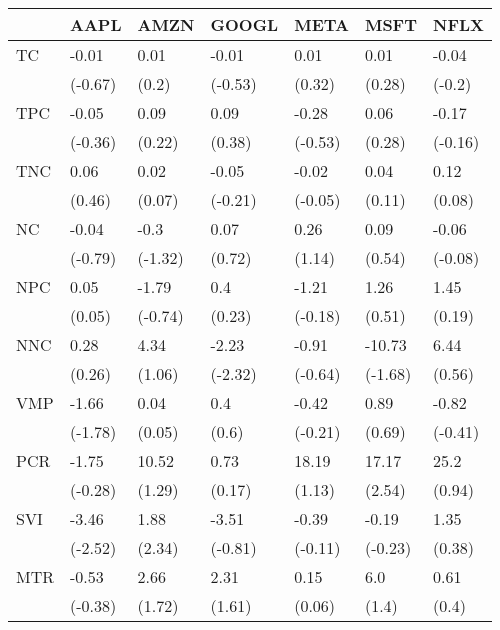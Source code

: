 \begin{tabular}{lllllll}
\toprule
{} &     AAPL &     AMZN &    GOOGL &     META &     MSFT &     NFLX \\
\midrule
TC  &    -0.01 &     0.01 &    -0.01 &     0.01 &     0.01 &    -0.04 \\
    &  (-0.67) &    (0.2) &  (-0.53) &   (0.32) &   (0.28) &   (-0.2) \\
TPC &    -0.05 &     0.09 &     0.09 &    -0.28 &     0.06 &    -0.17 \\
    &  (-0.36) &   (0.22) &   (0.38) &  (-0.53) &   (0.28) &  (-0.16) \\
TNC &     0.06 &     0.02 &    -0.05 &    -0.02 &     0.04 &     0.12 \\
    &   (0.46) &   (0.07) &  (-0.21) &  (-0.05) &   (0.11) &   (0.08) \\
NC  &    -0.04 &     -0.3 &     0.07 &     0.26 &     0.09 &    -0.06 \\
    &  (-0.79) &  (-1.32) &   (0.72) &   (1.14) &   (0.54) &  (-0.08) \\
NPC &     0.05 &    -1.79 &      0.4 &    -1.21 &     1.26 &     1.45 \\
    &   (0.05) &  (-0.74) &   (0.23) &  (-0.18) &   (0.51) &   (0.19) \\
NNC &     0.28 &     4.34 &    -2.23 &    -0.91 &   -10.73 &     6.44 \\
    &   (0.26) &   (1.06) &  (-2.32) &  (-0.64) &  (-1.68) &   (0.56) \\
VMP &    -1.66 &     0.04 &      0.4 &    -0.42 &     0.89 &    -0.82 \\
    &  (-1.78) &   (0.05) &    (0.6) &  (-0.21) &   (0.69) &  (-0.41) \\
PCR &    -1.75 &    10.52 &     0.73 &    18.19 &    17.17 &     25.2 \\
    &  (-0.28) &   (1.29) &   (0.17) &   (1.13) &   (2.54) &   (0.94) \\
SVI &    -3.46 &     1.88 &    -3.51 &    -0.39 &    -0.19 &     1.35 \\
    &  (-2.52) &   (2.34) &  (-0.81) &  (-0.11) &  (-0.23) &   (0.38) \\
MTR &    -0.53 &     2.66 &     2.31 &     0.15 &      6.0 &     0.61 \\
    &  (-0.38) &   (1.72) &   (1.61) &   (0.06) &    (1.4) &    (0.4) \\
\bottomrule
\end{tabular}
